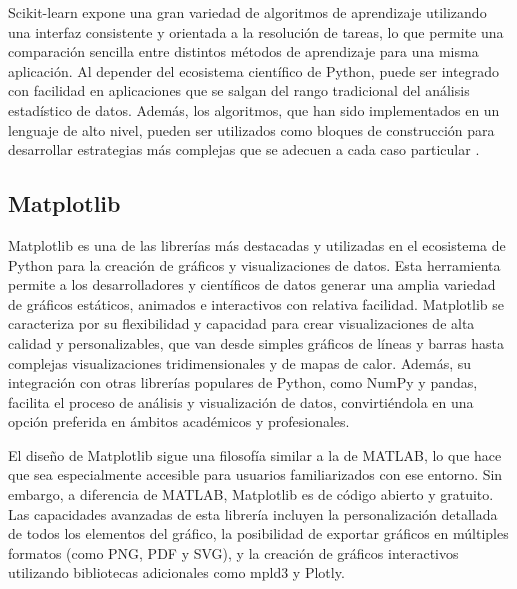 Scikit-learn expone una gran variedad de algoritmos de aprendizaje utilizando una interfaz consistente y orientada a la resolución de tareas, lo que permite una comparación sencilla entre distintos métodos de aprendizaje para una misma aplicación. Al depender del ecosistema científico de Python, puede ser integrado con facilidad en aplicaciones que se salgan del rango tradicional del análisis estadístico de datos. Además, los algoritmos, que han sido implementados en un lenguaje de alto nivel, pueden ser utilizados como bloques de construcción para desarrollar estrategias más complejas que se adecuen a cada caso particular \cite{vanderplas2022python}.


\subsection{Matplotlib}
\label{subsec:matplotlib}

Matplotlib es una de las librerías más destacadas y utilizadas en el ecosistema de Python para la creación de gráficos y visualizaciones de datos. Esta herramienta permite a los desarrolladores y científicos de datos generar una amplia variedad de gráficos estáticos, animados e interactivos con relativa facilidad. Matplotlib se caracteriza por su flexibilidad y capacidad para crear visualizaciones de alta calidad y personalizables, que van desde simples gráficos de líneas y barras hasta complejas visualizaciones tridimensionales y de mapas de calor. Además, su integración con otras librerías populares de Python, como NumPy y pandas, facilita el proceso de análisis y visualización de datos, convirtiéndola en una opción preferida en ámbitos académicos y profesionales.

El diseño de Matplotlib sigue una filosofía similar a la de MATLAB, lo que hace que sea especialmente accesible para usuarios familiarizados con ese entorno. Sin embargo, a diferencia de MATLAB, Matplotlib es de código abierto y gratuito. Las capacidades avanzadas de esta librería incluyen la personalización detallada de todos los elementos del gráfico, la posibilidad de exportar gráficos en múltiples formatos (como PNG, PDF y SVG), y la creación de gráficos interactivos utilizando bibliotecas adicionales como mpld3 y Plotly. 


